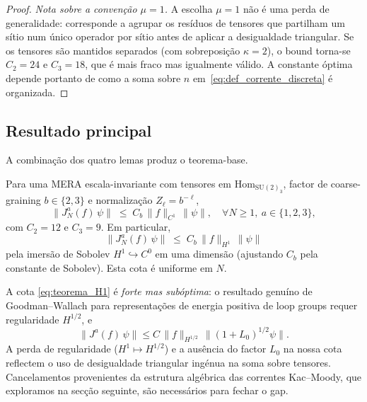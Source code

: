 \begin{proof}
\emph{Nota sobre a convenção $\mu = 1$.} A escolha $\mu = 1$ não é
uma perda de generalidade: corresponde a agrupar os resíduos de
tensores que partilham um sítio num único operador por sítio antes
de aplicar a desigualdade triangular. Se os tensores são mantidos
separados (com sobreposição $\kappa = 2$), o bound torna-se
$C_2 = 24$ e $C_3 = 18$, que é mais fraco mas igualmente válido.
A constante óptima depende portanto de como a soma sobre
$n$ em~\eqref{eq:def_corrente_discreta} é organizada.
\end{proof}

\subsection{Resultado principal}

A combinação dos quatro lemas produz o teorema-base.

\begin{theorem}\label{thm:bound_H1}
Para uma MERA escala-invariante com tensores em
$\mathrm{Hom}_{\mathrm{SU}(2)_3}$, factor de coarse-graining
$b \in \{2,3\}$ e normalização $Z_\ell = b^{-\ell}$,
\begin{equation}
  \bigl\|J_N^a(f)\,\psi\bigr\|
  \;\le\; C_b\,\|f\|_{C^1}\,\|\psi\|,
  \quad \forall N \ge 1,\ a \in \{1,2,3\},
  \label{eq:teorema_H1}
\end{equation}
com $C_2 = 12$ e $C_3 = 9$. Em particular,
\begin{equation}
  \bigl\|J_N^a(f)\,\psi\bigr\|
  \;\le\; C_b\,\|f\|_{H^1}\,\|\psi\|
  \label{eq:teorema_H1_Sobolev}
\end{equation}
pela imersão de Sobolev $H^1 \hookrightarrow C^0$ em uma dimensão
(ajustando $C_b$ pela constante de Sobolev). Esta cota é uniforme em $N$.
\end{theorem}

\begin{remark}[Limitações]\label{rem:limit_H1}
A cota \eqref{eq:teorema_H1} é \emph{forte mas subóptima}: o resultado
genuíno de Goodman--Wallach \cite{GW1985} para representações de
energia positiva de loop groups requer regularidade $H^{1/2}$, e
\begin{equation}
  \|J^a(f)\,\psi\| \le C\,\|f\|_{H^{1/2}}\,\|(1+L_0)^{1/2}\psi\|.
  \label{eq:GW_alvo}
\end{equation}
A perda de regularidade ($H^1 \mapsto H^{1/2}$) e a ausência do
factor $L_0$ na nossa cota reflectem o uso de desigualdade triangular
ingénua na soma sobre tensores. Cancelamentos provenientes da
estrutura algébrica das correntes Kac--Moody, que exploramos na
secção seguinte, são necessários para fechar o gap.
\end{remark}

